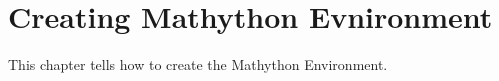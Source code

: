 
\chapter{Creating Mathython Evnironment}

This chapter tells how to create the Mathython Environment.